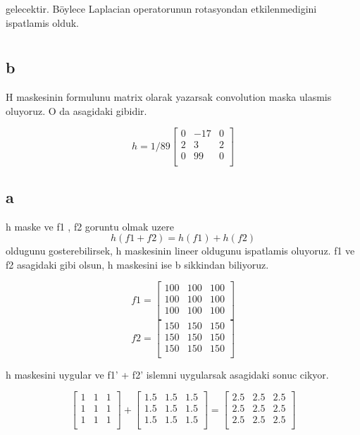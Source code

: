\documentclass[12pt]{article}
\begin{document}
gelecektir. Böylece Laplacian operatorunun rotasyondan etkilenmedigini ispatlamis olduk.






\section{}

\subsection{b}

H maskesinin formulunu matrix olarak yazarsak convolution maska ulasmis oluyoruz. O da asagidaki gibidir.

$$h =1/89 \begin{bmatrix}
 0&  -17&  0\\ 
 2&  3&  2\\ 
 0&  99&  0\\ 
\end{bmatrix}$$

\subsection{a}
h maske ve f1 , f2 goruntu olmak uzere $$h(f1 + f2 ) = h(f1) + h(f2) $$ oldugunu gosterebilirsek, h maskesinin lineer oldugunu ispatlamis oluyoruz.
f1 ve f2 asagidaki gibi olsun, h maskesini ise b sikkindan biliyoruz.


$$f1 =  \begin{bmatrix}
 100&  100&  100\\ 
 100&  100&  100\\ 
 100&  100&  100\\ 
\end{bmatrix}$$
$$f2 = \begin{bmatrix}
 150&  150&  150\\ 
 150&  150&  150\\ 
 150&  150&  150\\ 
\end{bmatrix}$$

h maskesini uygular ve f1' + f2' islemni uygularsak asagidaki sonuc cikyor.

$$\begin{bmatrix}
 1&  1&  1\\ 
 1&  1&  1\\ 
 1&  1&  1\\ 
\end{bmatrix} +
\begin{bmatrix}
 1.5&  1.5&  1.5\\ 
 1.5&  1.5&  1.5\\ 
 1.5&  1.5&  1.5\\ 
\end{bmatrix} = 
 \begin{bmatrix}
 2.5&  2.5&  2.5\\ 
 2.5&  2.5&  2.5\\ 
 2.5&  2.5&  2.5\\ 
\end{bmatrix}$$ 
\end{document}
